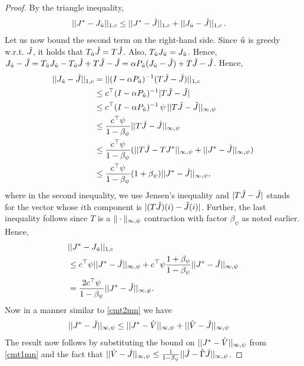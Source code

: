 \begin{proof}
By the triangle inequality,
\begin{align*}
||J^*-J_{\hat{u}}||_{1,c}&\leq ||J^*-\hat{J}||_{1,c}+||J_{\hat{u}}-\hat{J}||_{1,c}\,.
\end{align*}
Let us now bound the second term on the right-hand side.
Since $\hat{u}$ is greedy w.r.t. $\hat{J}$, it holds that $T_{\hat{u}} \hat{J} = T \hat{J}$.
Also, $T_{\hat{u}} J_{\hat{u}} = J_{\hat{u}}$.
Hence, $J_{\hat{u}} - \hat{J} = T_{\hat{u}} J_{\hat{u}} - T_{\hat{u}} \hat{J} + T \hat{J} - \hat{J}
=\alpha P_{\hat{u}} (J_{\hat{u}}- \hat{J}) + T\hat{J} - \hat{J}$.
Hence,
\begin{align}\label{polderv}
||J_{\hu}-\hj||_{1,c}\nn
&=||(I-\alpha P_{\hu})^{-1}(T\hj-\hj)||_{1,c}\nn\\
&\leq c^\top(I-\alpha P_{\hu})^{-1}|T\hj-\hj|\nn\\
&\leq c^\top (I-\alpha P_{\hu})^{-1} \,\psi\, ||T\hj-\hj||_{\mn}\nn\\
&\leq \frac{c^\top \psi}{1-\beta_{\psi}}||T\hj-\hj||_{\mn}\nn\\
&\leq \frac{c^\top \psi}{1-\beta_{\psi}}(||T\hj-TJ^*||_{\mn} +||J^*- \hj||_{\mn})\nn\\
&\leq \frac{c^\top \psi}{1-\beta_{\psi}}(1+\beta_{\psi})||J^*- \hj||_{\mn},
\end{align}
where in the second inequality, we use Jensen's inequality and $|T\hat{J} - \hat{J}|$ stands for the 
vector whose $i$th component is $|(T\hat{J})(i) - \hat{J}(i)|$. Further, the last inequality follows
since $T$ is a $\|\cdot\|_{\infty,\psi}$ contraction with factor $\beta_{\psi}$ as noted earlier.
Hence,
\begin{align}
&||J^*-J_{\hat{u}}||_{1,c}\nonumber\\
&\leq c^\top \psi ||J^*-\hat{J}||_{\infty,\psi}+c^\top \psi\frac{1+\beta_\psi}{1-\beta_\psi}||J^*- \hat{J}||_{\infty,\psi}\nonumber\\
&=\frac{2c^\top \psi}{1-\beta_{\psi}}||J^*- \hat{J}||_{\infty,\psi}.
\end{align}
Now in a manner similar to \cref{cmt2mn} we have
\begin{align}
||J^*- \hat{J}||_{\infty,\psi}&\leq ||J^*- \hat{V}||_{\infty,\psi}+||\hat{V} -\hat{J}||_{\infty,\psi}\nonumber
\end{align}
The result now follows by substituting the bound on $||J^*- \hat{V}||_{\infty,\psi}$ from \cref{cmt1mn} and the fact that $||\hat{V}-\hat{J}||_{\infty,\psi}\leq \frac{1}{1-\beta_{\psi}}||\hat{J}-\hat{\Gamma}\hat{J}||_{\infty,\psi}$.
\end{proof}
